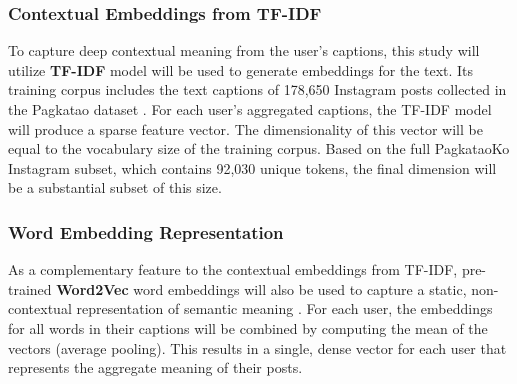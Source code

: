 \subsubsection{Contextual Embeddings from TF-IDF}
To capture deep contextual meaning from the user's captions, this study will utilize \textbf{TF-IDF} model will be used to generate embeddings for the text. Its training corpus includes the text captions of 178,650 Instagram posts collected in the Pagkatao dataset \citep{tighe_acorda_2022}. For each user's aggregated captions, the TF-IDF model will produce a sparse feature vector. The dimensionality of this vector will be equal to the vocabulary size of the training corpus. Based on the full PagkataoKo Instagram subset, which contains 92,030 unique tokens, the final dimension will be a substantial subset of this size.

\subsubsection{Word Embedding Representation}
As a complementary feature to the contextual embeddings from TF-IDF, pre-trained \textbf{Word2Vec} word embeddings will also be used to capture a static, non-contextual representation of semantic meaning \citep{Mikolov_Sutskever_Chen_Corrado_Dean_2013}. For each user, the embeddings for all words in their captions will be combined by computing the mean of the vectors (average pooling). This results in a single, dense vector for each user that represents the aggregate meaning of their posts.


